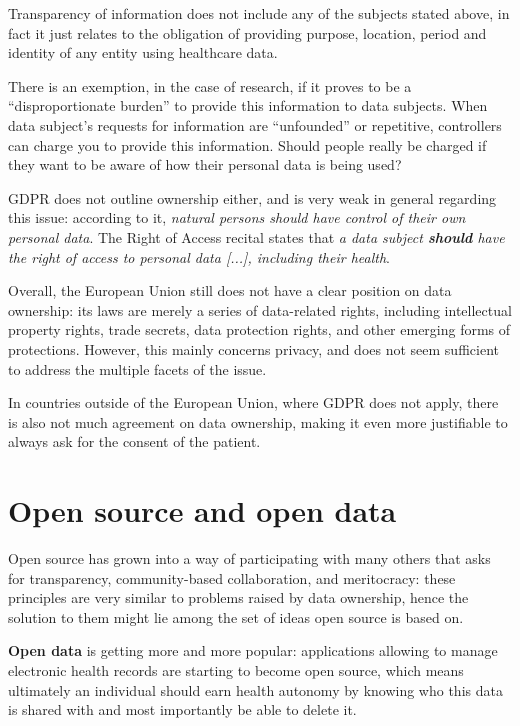 \documentclass[12pt]{article}
\begin{document}
	Transparency of information does not include any of the subjects stated above, in fact it just relates to the obligation of providing purpose, location, period and identity of any entity using healthcare data.
	
	There is an exemption, in the case of research, if it proves to be a “disproportionate burden” to provide this information to data subjects.
	When data subject’s requests for information are “unfounded” or repetitive, controllers can charge you to provide this information. Should people really be charged if they want to be aware of how their personal data is being used?
	
	GDPR does not outline ownership either, and is very weak in general regarding this issue: according to it, \textit{natural persons should have control of their own personal data}. The Right of Access recital states that \textit{a data subject \textbf{should} have the right of access to personal data [...], including their health}.
	
	Overall, the European Union still does not have a clear position on data ownership: its laws are merely a series of data-related rights, including intellectual property rights, trade secrets, data protection rights, and other emerging forms of protections. However, this mainly concerns privacy, and does not seem sufficient to address the multiple facets of the issue.
	
	In countries outside of the European Union, where GDPR does not apply, there is also not much agreement on data ownership, making it even more justifiable to always ask for the consent of the patient\cite{dataownership}.
	
	\section{Open source and open data}
	Open source has grown into a way of participating with many others that asks for transparency, community-based collaboration, and meritocracy: these principles are very similar to problems raised by data ownership, hence the solution to them might lie among the set of ideas open source is based on.
	
	\textbf{Open data} is getting more and more popular: applications allowing to manage electronic health records are starting to become open source, which means ultimately an individual should earn health autonomy by knowing who this data is shared with and most importantly be able to delete it.
	
\end{document}
